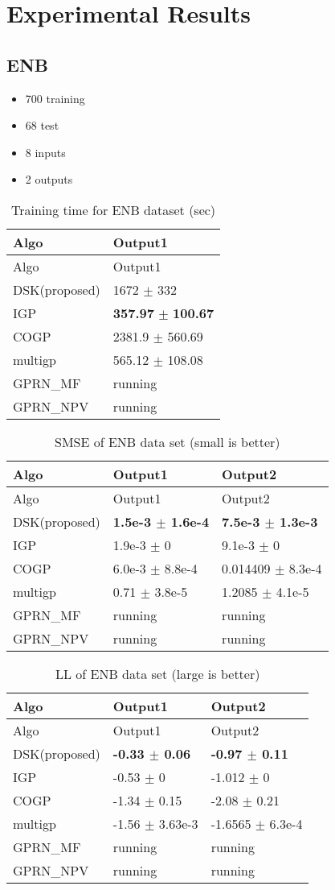 \section{Experimental Results}

\subsection{ENB}\label{enb}

\begin{itemize}
\item
  700 training
\item
  68 test
\item
  8 inputs
\item
  2 outputs
\end{itemize}

\begin{longtable}[]{@{}ll@{}}
\caption{Training time for ENB dataset (sec)}\tabularnewline
\toprule
Algo & Output1\tabularnewline
\midrule
\endfirsthead
\toprule
Algo & Output1\tabularnewline
\midrule
\endhead
DSK(proposed) & 1672 \(\pm\) 332\tabularnewline
IGP & \textbf{357.97} \(\pm\) \textbf{100.67}\tabularnewline
COGP & 2381.9 \(\pm\) 560.69\tabularnewline
multigp & 565.12 \(\pm\) 108.08\tabularnewline
GPRN\_MF & running\tabularnewline
GPRN\_NPV & running\tabularnewline
\bottomrule
\end{longtable}

\begin{longtable}[]{@{}lll@{}}
\caption{SMSE of ENB data set (small is better)}\tabularnewline
\toprule
Algo & Output1 & Output2\tabularnewline
\midrule
\endfirsthead
\toprule
Algo & Output1 & Output2\tabularnewline
\midrule
\endhead
DSK(proposed) & \textbf{1.5e-3 \(\pm\) 1.6e-4} & \textbf{7.5e-3 \(\pm\)
1.3e-3}\tabularnewline
IGP & 1.9e-3 \(\pm\) 0 & 9.1e-3 \(\pm\) 0\tabularnewline
COGP & 6.0e-3 \(\pm\) 8.8e-4 & 0.014409 \(\pm\) 8.3e-4\tabularnewline
multigp & 0.71 \(\pm\) 3.8e-5 & 1.2085 \(\pm\) 4.1e-5\tabularnewline
GPRN\_MF & running & running\tabularnewline
GPRN\_NPV & running & running\tabularnewline
\bottomrule
\end{longtable}

\begin{longtable}[]{@{}lll@{}}
\caption{LL of ENB data set (large is better)}\tabularnewline
\toprule
Algo & Output1 & Output2\tabularnewline
\midrule
\endfirsthead
\toprule
Algo & Output1 & Output2\tabularnewline
\midrule
\endhead
DSK(proposed) & \textbf{-0.33 \(\pm\) 0.06} & \textbf{-0.97 \(\pm\)
0.11}\tabularnewline
IGP & -0.53 \(\pm\) 0 & -1.012 \(\pm\) 0\tabularnewline
COGP & -1.34 \(\pm\) 0.15 & -2.08 \(\pm\) 0.21\tabularnewline
multigp & -1.56 \(\pm\) 3.63e-3 & -1.6565 \(\pm\) 6.3e-4\tabularnewline
GPRN\_MF & running & running\tabularnewline
GPRN\_NPV & running & running\tabularnewline
\bottomrule
\end{longtable}

